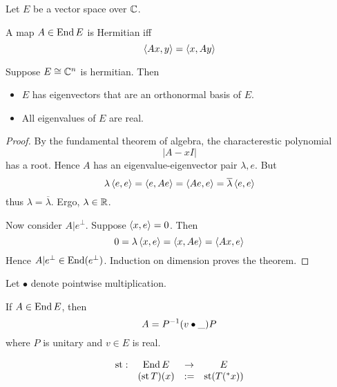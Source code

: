 \documentclass{scrartcl}
\newcommand{\conj}[1]{\overline{#1}}
\newcommand{\hyper}[1]{\prescript{*}{}{#1}}
\renewcommand{\define}{:=}
\DeclareMathOperator{\st}{st}
\begin{document}
  Let $E$ be a vector space over $\mathbb{C}$. 
\begin{defn}[Hermitian]
  A map $A\in \operatorname{End}{E}$ is Hermitian iff
  \[
    \left\langle Ax, y \right\rangle=\left\langle x, Ay \right\rangle
  \]
\end{defn}
\begin{theorem}
  \label{finite-spectral-theorem}
  Suppose $E\cong \mathbb{C}^n$ is hermitian. Then
  \begin{itemize}
  \item $E$ has eigenvectors that are an orthonormal basis of $E$.
  \item All eigenvalues of $E$ are real. 
  \end{itemize}

\end{theorem}
\begin{proof}
  \renewcommand{\vec}{}
  By the fundamental theorem of algebra, the characterestic polynomial
  \[
    |A-xI|
  \]
  has a root. Hence $A$ has an eigenvalue-eigenvector pair $\lambda, \vec e$. But
  \[
    \lambda \inner{\vec e}{\vec e}=\inner{\vec e}{A \vec e}=\inner{A\vec e}{\vec e}=\conj\lambda \inner{\vec e}{\vec e}
  \]
  thus $\lambda = \conj\lambda$. Ergo, $\lambda\in \mathbb{R}$. 

  Now consider $A|e^\perp$. Suppose $\left\langle x, e \right\rangle=0$. Then 
  \[
    0=\lambda\left\langle x, e \right\rangle=\left\langle x, Ae \right\rangle=\left\langle Ax, e \right\rangle
  \]
  Hence $A|e^\perp\in\operatorname{End}(e^\perp)$. Induction on dimension proves the theorem. 
\end{proof}

Let $\bullet$ denote pointwise multiplication. 
\begin{cor}[diagonalization]
  \label{thm:diag}
  If $A\in\operatorname{End} E$, then 
  \[
    A=P^{-1}(v\bullet\_)P\\
  \]
  where $P$ is unitary and $v\in E$ is real.
\end{cor}

\begin{defn}
  \[
  \begin{matrix}
   \st: &\End E &\to &E \\
    &(\st T)(x) &\define& \st( T(\hyper x))
  \end{matrix}
  \]
\end{defn}
\end{document}
